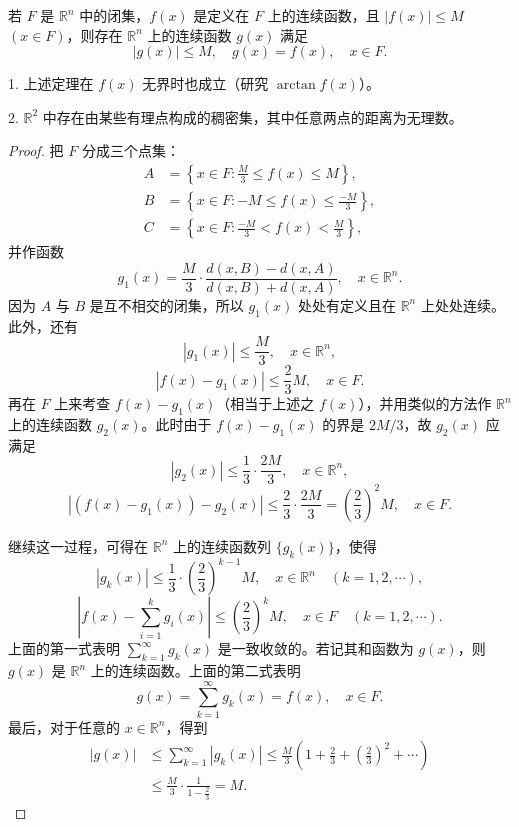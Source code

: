 \documentclass[../../main.tex]{subfiles}
\begin{document}
\begin{theorem}[连续延拓定理]\label{theorem:连续函数延拓定理}
若 \(F\) 是 \(\mathbb{R}^n\) 中的闭集，\(f(x)\) 是定义在 \(F\) 上的连续函数，且 \(|f(x)|\leqslant M\) \((x\in F)\)，则存在 \(\mathbb{R}^n\) 上的连续函数 \(g(x)\) 满足
\[
|g(x)|\leqslant M, \quad g(x)=f(x), \quad x\in F.
\]
\end{theorem}
\begin{remark}
1. 上述定理在 \(f(x)\) 无界时也成立（研究 \(\arctan f(x)\)）。

2. \(\mathbb{R}^2\) 中存在由某些有理点构成的稠密集，其中任意两点的距离为无理数。 
\end{remark}
\begin{proof}
把 \(F\) 分成三个点集：
\begin{align*}
A&=\left\{x\in F:\frac{M}{3}\leqslant f(x)\leqslant M\right\},\\
B&=\left\{x\in F:-M\leqslant f(x)\leqslant\frac{-M}{3}\right\},\\
C&=\left\{x\in F:\frac{-M}{3}<f(x)<\frac{M}{3}\right\},
\end{align*}
并作函数
\[
g_1(x)=\frac{M}{3}\cdot\frac{d(x,B)-d(x,A)}{d(x,B)+d(x,A)}, \quad x\in\mathbb{R}^n.
\]
因为 \(A\) 与 \(B\) 是互不相交的闭集，所以 \(g_1(x)\) 处处有定义且在 \(\mathbb{R}^n\) 上处处连续。此外，还有
\[
|g_1(x)|\leqslant\frac{M}{3}, \quad x\in\mathbb{R}^n,
\]
\[
|f(x)-g_1(x)|\leqslant\frac{2}{3}M, \quad x\in F.
\]
再在 \(F\) 上来考查 \(f(x)-g_1(x)\)（相当于上述之 \(f(x)\)），并用类似的方法作 \(\mathbb{R}^n\) 上的连续函数 \(g_2(x)\)。此时由于 \(f(x)-g_1(x)\) 的界是 \(2M/3\)，故 \(g_2(x)\) 应满足
\[
|g_2(x)|\leqslant\frac{1}{3}\cdot\frac{2M}{3}, \quad x\in\mathbb{R}^n,
\]
\[
|(f(x)-g_1(x))-g_2(x)|\leqslant\frac{2}{3}\cdot\frac{2M}{3}=\left(\frac{2}{3}\right)^2M, \quad x\in F.
\]

继续这一过程，可得在 \(\mathbb{R}^n\) 上的连续函数列 \(\{g_k(x)\}\)，使得
\[
|g_k(x)|\leqslant\frac{1}{3}\cdot\left(\frac{2}{3}\right)^{k - 1}M, \quad x\in\mathbb{R}^n \quad (k = 1,2,\cdots),
\]
\[
\left|f(x)-\sum_{i = 1}^{k}g_i(x)\right|\leqslant\left(\frac{2}{3}\right)^kM, \quad x\in F \quad (k = 1,2,\cdots).
\]
上面的第一式表明 \(\sum_{k = 1}^{\infty}g_k(x)\) 是一致收敛的。若记其和函数为 \(g(x)\)，则 \(g(x)\) 是 \(\mathbb{R}^n\) 上的连续函数。上面的第二式表明
\[
g(x)=\sum_{k = 1}^{\infty}g_k(x)=f(x), \quad x\in F.
\]
最后，对于任意的 \(x\in\mathbb{R}^n\)，得到
\begin{align*}
|g(x)|&\leqslant\sum_{k = 1}^{\infty}|g_k(x)|\leqslant\frac{M}{3}\left(1+\frac{2}{3}+\left(\frac{2}{3}\right)^2+\cdots\right)\\
&\leqslant\frac{M}{3}\cdot\frac{1}{1 - \frac{2}{3}}=M.
\end{align*}
\end{proof}
\end{document}
